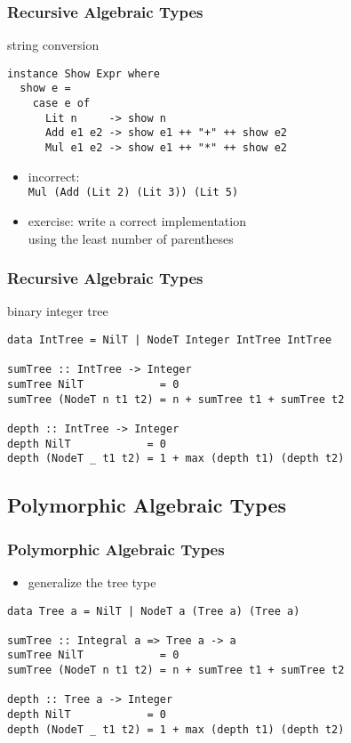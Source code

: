 \documentclass[dvipsnames]{beamer}
\theoremstyle{plain}
\begin{document}
\begin{frame}[fragile]
  \frametitle{Recursive Algebraic Types}

  \begin{exampleblock}{string conversion}
    \begin{lstlisting}
instance Show Expr where
  show e =
    case e of
      Lit n     -> show n
      Add e1 e2 -> show e1 ++ "+" ++ show e2
      Mul e1 e2 -> show e1 ++ "*" ++ show e2
    \end{lstlisting}
  \end{exampleblock}

  \pause
  \begin{itemize}
    \item incorrect:\\
      \lstinline|Mul (Add (Lit 2) (Lit 3)) (Lit 5)|
    \item exercise: write a correct implementation\\
      using the least number of parentheses
  \end{itemize}
\end{frame}

\begin{frame}[fragile]
  \frametitle{Recursive Algebraic Types}

  \begin{exampleblock}{binary integer tree}
    \begin{lstlisting}
data IntTree = NilT | NodeT Integer IntTree IntTree

sumTree :: IntTree -> Integer
sumTree NilT            = 0
sumTree (NodeT n t1 t2) = n + sumTree t1 + sumTree t2

depth :: IntTree -> Integer
depth NilT            = 0
depth (NodeT _ t1 t2) = 1 + max (depth t1) (depth t2)
    \end{lstlisting}
  \end{exampleblock}
\end{frame}

\subsection{Polymorphic Algebraic Types}

\begin{frame}[fragile]
  \frametitle{Polymorphic Algebraic Types}

  \begin{itemize}
    \item generalize the tree type
  \end{itemize}

  \begin{exampleblock}{}
    \begin{lstlisting}
data Tree a = NilT | NodeT a (Tree a) (Tree a)

sumTree :: Integral a => Tree a -> a
sumTree NilT            = 0
sumTree (NodeT n t1 t2) = n + sumTree t1 + sumTree t2

depth :: Tree a -> Integer
depth NilT            = 0
depth (NodeT _ t1 t2) = 1 + max (depth t1) (depth t2)
    \end{lstlisting}
  \end{exampleblock}
\end{frame}
\end{document}
